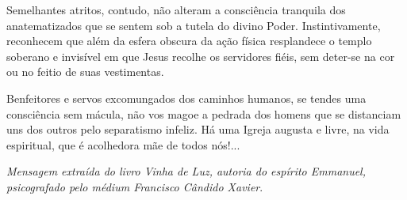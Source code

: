 \emdash{}Semelhantes atritos, contudo, não alteram a consciência tranquila dos anatematizados que se sentem sob a tutela do divino Poder. Instintivamente, reconhecem que além da esfera obscura da ação física resplandece o templo soberano e invisível em que Jesus recolhe os servidores fiéis, sem deter-se na cor ou no feitio de suas vestimentas.

\emdash{}Benfeitores e servos excomungados dos caminhos humanos, se tendes uma consciência sem mácula, não vos magoe a pedrada dos homens que se distanciam uns dos outros pelo separatismo infeliz. Há uma Igreja augusta e livre, na vida espiritual, que é acolhedora mãe de todos nós!...

\emdash{}\textit{Mensagem extraída do livro Vinha de Luz, autoria do espírito Emmanuel, psicografado pelo médium Francisco Cândido Xavier}.